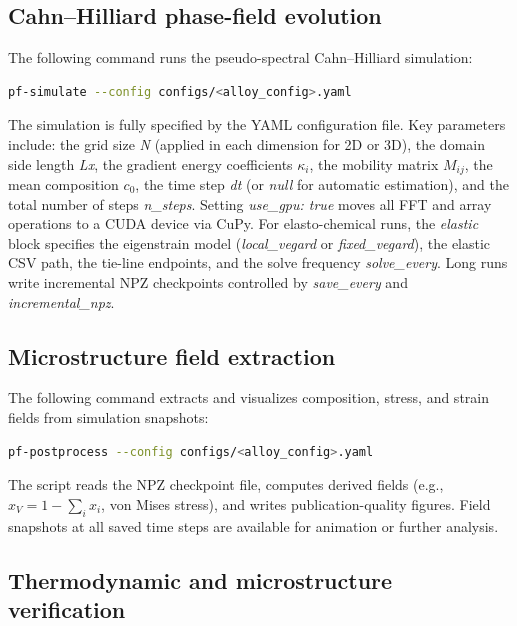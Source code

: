 \documentclass[12pt]{article}
\begin{document}
\subsection{Cahn--Hilliard phase-field evolution}

The following command runs the pseudo-spectral Cahn--Hilliard simulation:
\begin{lstlisting}[language=bash]
pf-simulate --config configs/<alloy_config>.yaml
\end{lstlisting}
The simulation is fully specified by the YAML configuration file. Key parameters include: the grid size \emph{N} (applied in each dimension for 2D or 3D), the domain side length \emph{Lx}, the gradient energy coefficients $\kappa_i$, the mobility matrix $M_{ij}$, the mean composition $c_0$, the time step \emph{dt} (or \emph{null} for automatic estimation), and the total number of steps \emph{n\_steps}. Setting \emph{use\_gpu: true} moves all FFT and array operations to a CUDA device via CuPy. For elasto-chemical runs, the \emph{elastic} block specifies the eigenstrain model (\emph{local\_vegard} or \emph{fixed\_vegard}), the elastic CSV path, the tie-line endpoints, and the solve frequency \emph{solve\_every}. Long runs write incremental NPZ checkpoints controlled by \emph{save\_every} and \emph{incremental\_npz}.

\subsection{Microstructure field extraction}

The following command extracts and visualizes composition, stress, and strain fields from simulation snapshots:
\begin{lstlisting}[language=bash]
pf-postprocess --config configs/<alloy_config>.yaml
\end{lstlisting}
The script reads the NPZ checkpoint file, computes derived fields (e.g., $x_V = 1 - \sum_i x_i$, von Mises stress), and writes publication-quality figures. Field snapshots at all saved time steps are available for animation or further analysis.

\subsection{Thermodynamic and microstructure verification}
\end{document}
